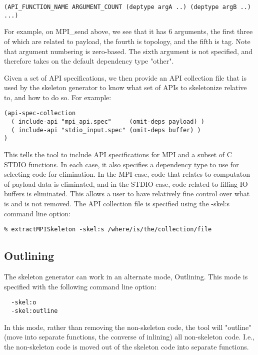 \documentclass{article}
\begin{document}
\begin{verbatim}
(API_FUNCTION_NAME ARGUMENT_COUNT (deptype argA ..) (deptype argB ..) ...)
\end{verbatim}

For example, on MPI\_send above, we see that it has 6 arguments, the
first three of which are related to payload, the fourth is topology,
and the fifth is tag.  Note that argument numbering is zero-based.
The sixth argument is not specified, and therefore takes on the
default dependency type "other".

Given a set of API specifications, we then provide an API collection
file that is used by the skeleton generator to know what set of APIs
to skeletonize relative to, and how to do so.  For example:

\begin{verbatim}
(api-spec-collection
  ( include-api "mpi_api.spec"     (omit-deps payload) )
  ( include-api "stdio_input.spec" (omit-deps buffer) )
)
\end{verbatim}

This tells the tool to include API specifications for MPI and a subset
of C STDIO functions.  In each case, it also specifies a dependency
type to use for selecting code for elimination.  In the MPI case, code
that relates to computaton of payload data is eliminated, and in the
STDIO case, code related to filling IO buffers is eliminated.  This
allows a user to have relatively fine control over what is and is not
removed.  The API collection file is specified using the -skel:s
command line option:

\begin{verbatim}
% extractMPISkeleton -skel:s /where/is/the/collection/file
\end{verbatim}

\subsection{Outlining}

The skeleton generator can work in an alternate mode, Outlining.  This mode is
specified with the following command line option:

\begin{verbatim}
  -skel:o
  -skel:outline
\end{verbatim}

In this mode, rather than removing the non-skeleton code, the tool will
"outline" (move into separate functions, the converse of inlining) all
non-skeleton code.  I.e., the non-skeleton code is moved out of the skeleton
code into separate functions.
\end{document}
